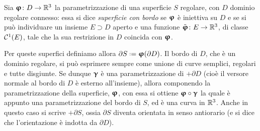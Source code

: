 \begin{definizione} \label{d:superfici-con-bordo}
	Sia $\bm{\upvarphi}\colon D\to\mathbb{R}^3$ la parametrizzazione di una superficie $S$ regolare, con $D$ dominio regolare connesso: essa si dice \emph{superficie con bordo} se $\bm{\upvarphi}$ è iniettiva su $D$ e se si può individuare un insieme $E\supset D$ aperto e una funzione $\tilde{\bm{\upvarphi}}\colon E\to\mathbb{R}^3$, di classe $\mathcal{C}^{{1}}(E)$, tale che la sua restrizione in $D$ coincida con $\bm{\upvarphi}$.
\end{definizione}
Per queste superfici definiamo allora $\partial S\defeq\vphi(\partial D)$.
Il bordo di $D$, che è un dominio regolare, si può esprimere sempre come unione di curve semplici, regolari e tutte disgiunte.
Se dunque $\bm{\upgamma}$ è una parametrizzazione di $+\partial D$ (cioè il versore normale al bordo di $D$ è esterno all'insieme), allora componendo la parametrizzazione della superficie, $\bm{\upvarphi}$, con essa si ottiene $\bm{\upvarphi}\circ\bm{\upgamma}$ la quale è appunto una parametrizzazione del bordo di $S$, ed è una curva in $\mathbb{R}^3$.
Anche in questo caso si scrive $+\partial S$, ossia $\partial S$ diventa orientata in senso antiorario (e si dice che l'orientazione è indotta da $\partial D$).

